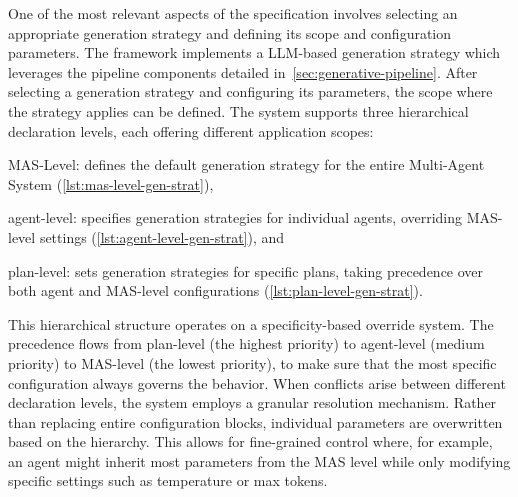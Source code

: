 \documentclass[12pt,a4paper,openright,twoside]{book}
\begin{document}
One of the most relevant aspects of the specification involves selecting an appropriate generation strategy and defining its scope and configuration parameters. 
%
The framework implements a \ac{LLM}-based generation strategy which leverages the pipeline components detailed in~\cref{sec:generative-pipeline}.
%
After selecting a generation strategy and configuring its parameters, the scope where the strategy applies can be defined. The system supports three hierarchical declaration levels, each offering different application scopes:
%
\begin{inlinelist}
    \item \ac{MAS}-Level: defines the default generation strategy for the entire Multi-Agent System (\cref{lst:mas-level-gen-strat}),
    \item agent-level: specifies generation strategies for individual agents, overriding MAS-level settings (\cref{lst:agent-level-gen-strat}), and
    \item plan-level: sets generation strategies for specific plans, taking precedence over both agent and MAS-level configurations (\cref{lst:plan-level-gen-strat}).
\end{inlinelist}
%
This hierarchical structure operates on a specificity-based override system. 
%
The precedence flows from plan-level (the highest priority) to agent-level (medium priority) to MAS-level (the lowest priority), to make sure that the most specific configuration always governs the behavior.
%
When conflicts arise between different declaration levels, the system employs a granular resolution mechanism.
%
Rather than replacing entire configuration blocks, individual parameters are overwritten based on the hierarchy.
%
This allows for fine-grained control where, for example, an agent might inherit most parameters from the MAS level while only modifying specific settings such as temperature or max tokens.




\end{document}
